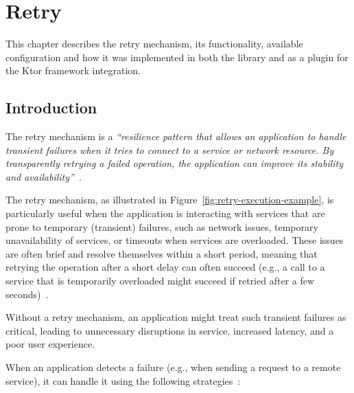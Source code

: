 \chapter{Retry}\label{ch:retry}

This chapter describes the retry mechanism, its functionality, available configuration and how it was implemented in both the library and as a plugin for the Ktor framework integration.


\section{Introduction}\label{sec:retry-context}

The retry mechanism is a \textit{\enquote{resilience pattern that allows an application to handle transient failures when it tries to connect to a service or network resource.
By transparently retrying a failed operation, the application can improve its stability and availability}}~\cite{microsoft-retry-pattern}.

The retry mechanism, as illustrated in Figure~\ref{fig:retry-execution-example},
is particularly useful when the application is interacting with services that are prone to temporary
(transient) failures, such as network issues,
temporary unavailability of services, or timeouts when services are overloaded.
These issues are often brief and resolve themselves within a short period,
meaning that retrying the operation after a short delay can often succeed
(e.g.,
a call to a service that is temporarily overloaded might succeed
if retried after a few seconds)~\cite{microsoft-retry-pattern}.

Without a retry mechanism, an application might treat such transient failures as critical,
leading to unnecessary disruptions in service, increased latency, and a poor user experience.

When an application detects a failure (e.g., when sending a request to a remote service), it can handle it using the following strategies~\cite{microsoft-retry-pattern}:

